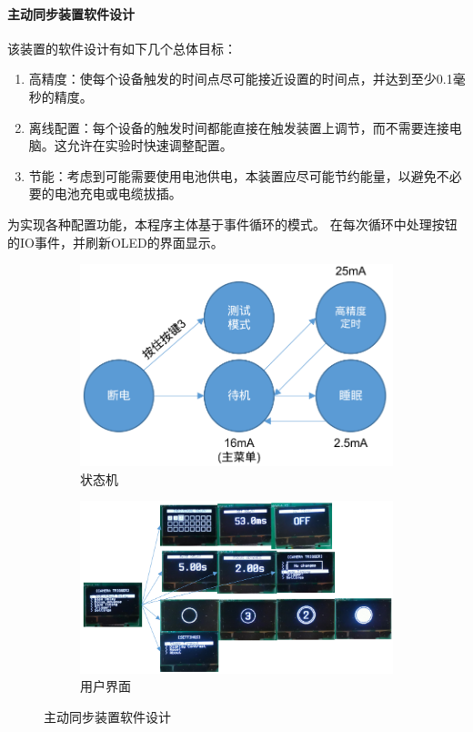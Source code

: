 \paragraph{主动同步装置软件设计}
该装置的软件设计有如下几个总体目标：
\begin{enumerate}
\item 高精度：使每个设备触发的时间点尽可能接近设置的时间点，并达到至少0.1毫秒的精度。
\item 离线配置：每个设备的触发时间都能直接在触发装置上调节，而不需要连接电脑。这允许在实验时快速调整配置。
\item 节能：考虑到可能需要使用电池供电，本装置应尽可能节约能量，以避免不必要的电池充电或电缆拔插。
\end{enumerate}

为实现各种配置功能，本程序主体基于事件循环的模式。
在每次循环中处理按钮的IO事件，并刷新OLED的界面显示。
\begin{figure}
\centering
\begin{subfigure}{.45\textwidth}
    \includegraphics[width=\textwidth]{figures/active_sync_states}
    \caption{状态机}
    \label{fig:active_sync_states}
\end{subfigure}%
\begin{subfigure}{.55\textwidth}
    \includegraphics[width=\textwidth]{figures/active_sync_ui}
    \caption{用户界面}
    \label{fig:active_sync_ui}
\end{subfigure}%
\caption{主动同步装置软件设计}
\end{figure}
